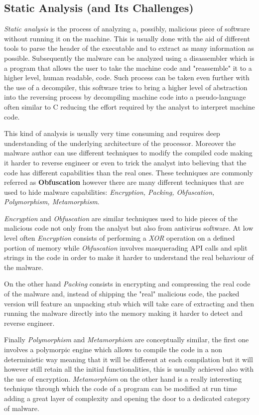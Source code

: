 \subsection*{Static Analysis (and Its Challenges)}

\textit{Static analysis} is the process of analyzing a, possibly, malicious piece of software without running it on the machine. This is usually done with the aid of different tools to parse the header of the executable and to extract as many information as possible. Subsequently the malware can be analyzed using a disassembler which is a program that allows the user to take the machine code and "reassemble" it to a higher level, human readable, code. Such process can be taken even further with the use of a decompiler, this software tries to bring a higher level of abstraction into the reversing process by decompiling machine code into a pseudo-language often similar to C reducing the effort required by the analyst to interpret machine code.

This kind of analysis is usually very time consuming and requires deep understanding of the underlying architecture of the processor. Moreover the malware author can use different techniques to modify the compiled code making it harder to reverse engineer or even to trick the analyst into believing that the code has different capabilities than the real ones. These techniques are commonly referred as \textbf{Obfuscation} however there are many different techniques that are used to hide malware capabilities: \textit{Encryption, Packing, Obfuscation, Polymorphism, Metamorphism}.\cite{Ye2017ASO}

\textit{Encryption} and \textit{Obfuscation} are similar techniques used to hide pieces of the malicious code not only from the analyst but also from antivirus software. At low level often \textit{Encryption} consists of performing a \textit{XOR} operation on a defined portion of memory while \textit{Obfuscation} involves masquerading API calls and split strings in the code in order to make it harder to understand the real behaviour of the malware.

On the other hand \textit{Packing} consists in encrypting and compressing the real code of the malware and, instead of shipping the "real" malicious code, the packed version will feature an unpacking stub which will take care of extracting and then running the malware directly into the memory making it harder to detect and reverse engineer.

Finally \textit{Polymorphism} and \textit{Metamorphism} are conceptually similar, the first one involves a polymorpic engine which allows to compile the code in a non deterministic way meaning that it will be different at each compilation but it will however still retain all the initial functionalities, this is usually achieved also with the use of encryption. \textit{Metamorphism} on the other hand is a really interesting technique through which the code of a program can be modified at run time adding a great layer of complexity and opening the door to a dedicated category of malware.

